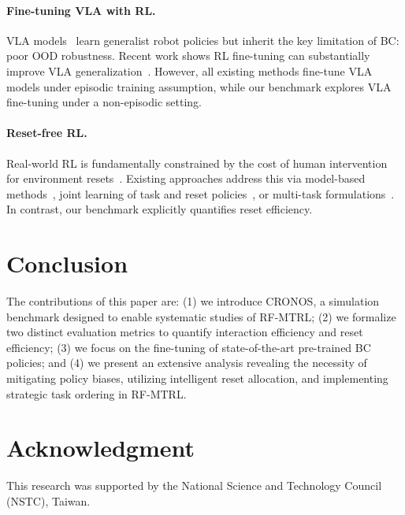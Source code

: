 \paragraph{Fine-tuning VLA with RL.}
VLA models~\cite{intelligence2025pi05,kim2024openvla,oneill2024openx,ankile2025residual,team2024octo} learn generalist robot policies but inherit the key limitation of BC: poor OOD robustness. Recent work shows RL fine-tuning can substantially improve VLA generalization~\cite{liu2025rlvla,zhang2025reinbot,huang2025corft,li2025vlarft,lu2025vlarl}. However, all existing methods fine-tune VLA models under episodic training assumption, while our benchmark explores VLA fine-tuning under a non-episodic setting.

\paragraph{Reset-free RL.}
Real-world RL is fundamentally constrained by the cost of human intervention for environment resets~\cite{liu2023libero,sharma2021earl}. Existing approaches address this via model-based methods~\cite{yang2025resetfree,treven2024neorl}, joint learning of task and reset policies~\cite{lee2024selfimproving,patil2024intelligent,sharma2023selfimproving,kim2023demoauto,walke2022dontstart,sharma2022statedist,eysenbach2017leavenottrace,xie2022proactive}, or multi-task formulations~\cite{gupta2022demo,xu2022dexterous,gupta2021resetfree,ha2020walk}. In contrast, our benchmark explicitly quantifies reset efficiency.

\section{Conclusion}

The contributions of this paper are: (1) we introduce CRONOS, a simulation benchmark designed to enable systematic studies of RF-MTRL; (2) we formalize two distinct evaluation metrics to quantify interaction efficiency and reset efficiency; (3) we focus on the fine-tuning of state-of-the-art pre-trained BC policies; and (4) we present an extensive analysis revealing the necessity of mitigating policy biases, utilizing intelligent reset allocation, and implementing strategic task ordering in RF-MTRL.

\clearpage
{
    \small
    \section*{Acknowledgment}
        This research was supported by the National Science and Technology Council (NSTC), Taiwan.
    
    
}


